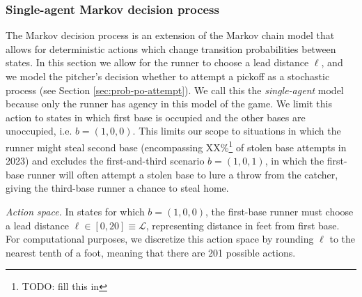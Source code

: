 \documentclass{article}
\begin{document}
      \subsubsection{Single-agent Markov decision process}
      \label{sec:single-agent-mdp}

        The Markov decision process is an extension of the Markov chain model that allows for deterministic actions which change transition probabilities between states. In this section we allow for the runner to choose a lead distance $\ell$, and we model the pitcher's decision whether to attempt a pickoff as a stochastic process (see Section \ref{sec:prob-po-attempt}). We call this the {\it single-agent} model because only the runner has agency in this model of the game. We limit this action to states in which first base is occupied and the other bases are unoccupied, i.e. $b = (1, 0, 0)$. This limits our scope to situations in which the runner might steal second base (encompassing XX\%\footnote{TODO: fill this in} of stolen base attempts in 2023) and excludes the first-and-third scenario $b = (1, 0, 1)$, in which the first-base runner will often attempt a stolen base to lure a throw from the catcher, giving the third-base runner a chance to steal home.
     
        {\it Action space.} In states for which $b = (1, 0, 0)$, the first-base runner must choose a lead distance $\ell \in [0, 20] \equiv \mathcal{L}$, representing distance in feet from first base. For computational purposes, we discretize this action space by rounding $\ell$ to the nearest tenth of a foot, meaning that there are 201 possible actions.
  
\end{document}
